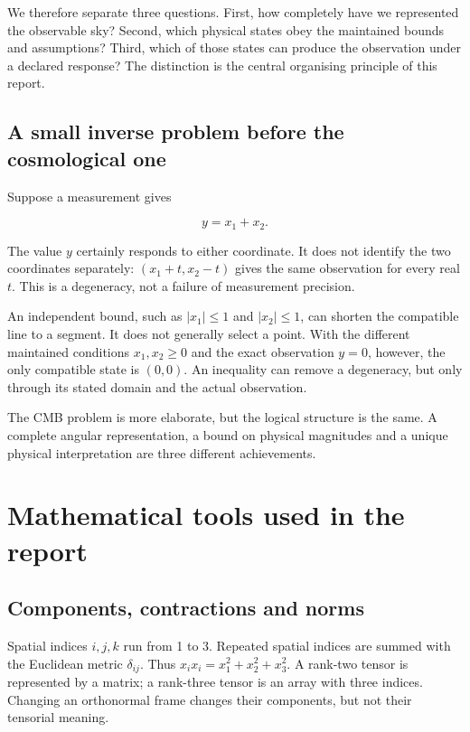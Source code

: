 \documentclass[
  11pt,
  a4paper]{article}
\begin{document}
We therefore separate three questions. First, how completely have we represented the observable sky? Second, which physical states obey the maintained bounds and assumptions? Third, which of those states can produce the observation under a declared response? The distinction is the central organising principle of this report.

\hypertarget{a-small-inverse-problem-before-the-cosmological-one}{%
\subsection{A small inverse problem before the cosmological one}\label{a-small-inverse-problem-before-the-cosmological-one}}

Suppose a measurement gives

\[
y=x_1+x_2.
\tag{1.2}
\]

The value \(y\) certainly responds to either coordinate. It does not identify the two coordinates separately: \((x_1+t,x_2-t)\) gives the same observation for every real \(t\). This is a degeneracy, not a failure of measurement precision.

An independent bound, such as \(|x_1|\le1\) and \(|x_2|\le1\), can shorten the compatible line to a segment. It does not generally select a point. With the different maintained conditions \(x_1,x_2\ge0\) and the exact observation \(y=0\), however, the only compatible state is \((0,0)\). An inequality can remove a degeneracy, but only through its stated domain and the actual observation.

The CMB problem is more elaborate, but the logical structure is the same. A complete angular representation, a bound on physical magnitudes and a unique physical interpretation are three different achievements.

\hypertarget{mathematical-tools-used-in-the-report}{%
\section{Mathematical tools used in the report}\label{mathematical-tools-used-in-the-report}}

\hypertarget{components-contractions-and-norms}{%
\subsection{Components, contractions and norms}\label{components-contractions-and-norms}}

Spatial indices \(i,j,k\) run from 1 to 3. Repeated spatial indices are summed with the Euclidean metric \(\delta_{ij}\). Thus \(x_ix_i=x_1^2+x_2^2+x_3^2\). A rank-two tensor is represented by a matrix; a rank-three tensor is an array with three indices. Changing an orthonormal frame changes their components, but not their tensorial meaning.
\end{document}
